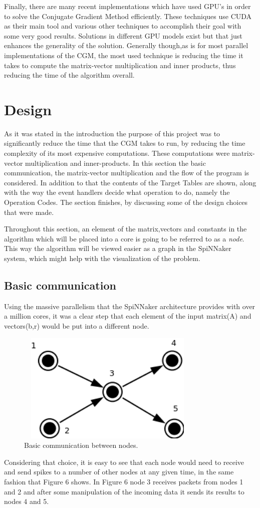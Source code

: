 \documentclass[12pt,a4paper]{article}
\begin{document}
Finally, there are many recent implementations which have used GPU's in order to solve the Conjugate Gradient Method efficiently. These techniques use CUDA as their main tool and various other techniques to accomplish their goal with some very good results. Solutions in different GPU models exist but that just enhances the generality of the solution. Generally though,as is for most parallel implementations of the CGM, the most used technique is reducing the time it takes to compute the matrix-vector multiplication and inner products, thus reducing the time of the algorithm overall\cite{galiano2012gpu}\cite{wozniak2010parallel}.
\section{Design}
As it was stated in the introduction the purpose of this project was to significantly reduce the time that the CGM takes to run, by reducing the time complexity of its most expensive computations. These computations were matrix-vector multiplication and inner-products. In this section the basic communication, the matrix-vector multiplication and the flow of the program is considered. In addition to that the contents of the Target Tables are shown, along with the way the event handlers decide what operation to do, namely the Operation Codes. The section finishes, by discussing some of the design choices that were made. 

Throughout this section, an element of the matrix,vectors and constants in the algorithm which will be placed into a core is going to be referred to as a \emph{node}. This way the algorithm will be viewed easier as a graph in the SpiNNaker system, which might help with the visualization of the problem.

\subsection{Basic communication}
Using the massive parallelism that the SpiNNaker architecture provides with over a million cores, it was a clear step that each element of the input matrix(A) and vectors(b,r) would be put into a different node. 
\begin{figure}[h!]
\includegraphics[width=250pt,height=150pt,scale=2]{Pics/basic.png}
\centering
\caption{Basic communication between nodes.}
\end{figure}
Considering that choice, it is easy to see that each node would need to receive and send spikes to a number of other nodes at any given time, in the same fashion that Figure 6 shows. In Figure 6 node 3 receives packets from nodes 1 and 2 and after some manipulation of the incoming data it sends its results to nodes 4 and 5. 
\end{document}
